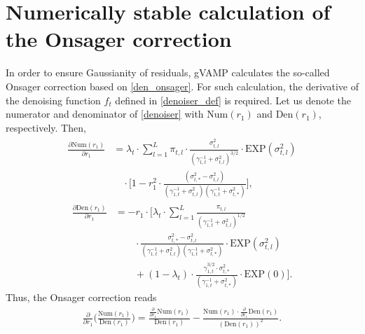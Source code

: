 \section{Numerically stable calculation of the Onsager correction}
\label{supp:note2}
In order to ensure Gaussianity of residuals, gVAMP calculates the so-called Onsager correction based on \eqref{den_onsager}. For such calculation, the derivative of the denoising function $f_t$ defined in \eqref{denoiser_def} is required. Let us denote the numerator and denominator of \eqref{denoiser} with $\text{Num}(r_1)$ and $\text{Den}(r_1)$, respectively. Then, 
\begin{align}
    \begin{split}
    \frac{\partial \text{Num}(r_1)}{\partial r_1} & = \lambda_t \cdot \sum_{l=1}^L \pi_{t,l} \cdot \frac{\sigma_{t,l}^2}{(\gamma_{1,t}^{-1}+\sigma_{t,l}^2)^{3/2}} \cdot \text{EXP}(\sigma_{t,l}^2) \\
    & \quad \cdot \bigg [1 - r_1^2 \cdot \frac{(\sigma_{t,*}^2 - \sigma_{t,l}^2)}{(\gamma_{1,t}^{-1} + \sigma_{t,l}^2)(\gamma_{1,t}^{-1}+ \sigma_{t,*}^2)} \bigg ],
    \end{split}
\end{align}
\begin{equation}
    \begin{split}
    \frac{\partial \text{Den}(r_1)}{\partial r_1} & = -r_1 \cdot \bigg [ \lambda_t \cdot \sum_{l=1}^L \frac{\pi_{t,l}}{(\gamma_{1,t}^{-1} + \sigma_{t,l}^2)^{1/2}} \\
    & \qquad \cdot \frac{\sigma_{t,*}^2 - \sigma_{t,l}^2}{(\gamma_{1,t}^{-1} + \sigma_{t,l}^2)(\gamma_{1,t}^{-1}+\sigma_{t,*}^2)} \cdot \text{EXP}(\sigma_{t,l}^2) \\
    & \qquad +  (1 - \lambda_t) \cdot \frac{\gamma_{1,t}^{3/2} \cdot \sigma_{t, *}^2}{(\gamma_{1,t}^{-1}+\sigma_{t,*}^2)} \cdot \text{EXP}(0)  \bigg ].
    \end{split}
\end{equation}
Thus, the Onsager correction reads
\begin{align}
    \frac{\partial }{\partial r_1} \bigg ( \frac{\text{Num}(r_1)}{\text{Den}(r_1)} \bigg ) =  \frac{\frac{\partial}{\partial r_1} \text{Num}(r_1)}{\text{Den}(r_1)} - \frac{ \text{Num}(r_1) \cdot \frac{\partial}{\partial r_1}\text{Den}(r_1)}{(\text{Den}(r_1))^2}.
\end{align}
\vspace{5mm}

